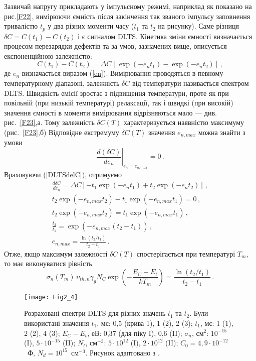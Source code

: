 Зазвичай напругу прикладають у імпульсному режимі, наприклад як показано на рис.\ref{F22},
вимірюючи ємність після закінчення так званого імпульсу заповнення тривалістю $t_p$
у два різних моменти часу ($t_1$ та $t_2$ на рисунку).
Саме різниця $\delta C=C(t_1)-C(t_2)$ і є сигналом DLTS.
Кінетика зміни ємності визначається процесом перезарядки дефектів
та за умов, зазначених вище, описується експоненційною залежністю:
\begin{equation}
\label{DLTSdelC}
C(t_1)-C(t_2)=\Delta C\,\left[\exp(-e_n t_1)-\exp(-e_n t_2)\right]\,,
\end{equation}
де
$e_n$ визначається виразом (\ref{en}).
Вимірювання проводяться в певному температурному діапазоні, залежність
$\delta C$ від температури називається спектром DLTS.
Швидкість емісії зростає з підвищення температури,
проте як при повільній (при низькій температурі) релаксації,
так і швидкі (при високій)
значення ємності в моменти вимірювання відрізняються мало --- див. рис.~\ref{F23},а.
Тому залежність $\delta C(T)$
характеризується наявністю максимуму (рис.~\ref{F23},б)
Відповідне екстремуму $\delta C(T)$ значення $e_{n,max}$ можна знайти з умови
\begin{equation*}
\left.\frac{d(\delta C)}{d e_n}\right|_{e_n=e_{n,max}}=0\,.
\end{equation*}
Враховуючи (\ref{DLTSdelC}), отримуємо
\begin{gather}
  \frac{d\delta C}{d e_n} = \Delta C \left[-t_1\exp(-e_n t_1)+t_2\exp(-e_n t_2)\right]\,, \nonumber\\
  t_2\exp(-e_{n,max} t_2)-t_1\exp(-e_{n,max} t_1)= 0\,,\nonumber\\
  t_2\exp(-e_{n,max} t_2)= t_1\exp(-e_{n,max} t_1)\,, \nonumber\\
  \frac{t_2}{t_1} = \exp(-e_{n,max} (t_2-t_1))\,, \nonumber\\
  e_{n,max}=\frac{\ln\left(t_2/t_1\right)}{t_2-t_1}\,.\label{DLTSemax}
\end{gather}
Отже, якщо максимум залежності $\delta C(T)$ спостерігається при температурі $T_m$,
то має виконуватися рівність
\begin{equation}
\label{DLTSTmax}
\sigma_n(T_m)\,\upsilon_{th,n}\gamma_g N_C \exp\left(-\frac{E_C-E_t}{kT_m}\right)=\frac{\ln\left(t_2/t_1\right)}{t_2-t_1}\,.
\end{equation}

\begin{figure}[!b]
\center
\vspace{-5mm}
\texttt{[image: Fig2\_4]}
\vspace{-3mm}
\caption{Розраховані спектри DLTS для різних значень $t_1$ та $t_2$.
Були використані значення
$t_1$, мс: 0,5 (крива 1), 1 (2), 2 (3);
$t_1$, мс: 1 (1), 2 (2), 4 (3);
$E_C-E_t$, еВ: 0,37 (для піку I), 0,6 (II);
$\sigma_n$, см$^2$: $10^{-15}$ (I), $5\cdot10^{-15}$ (II);
$N_t$, см$^{-3}$: $5\cdot10^{12}$ (I), $2\cdot10^{12}$ (II);
$C_0=4,9\cdot10^{-12}$~Ф, $N_d=10^{15}$~см$^{-3}$.
Рисунок адаптовано з \cite{Schroder2006}.
}
\vspace{-3mm}
\label{F24}
\end{figure}


